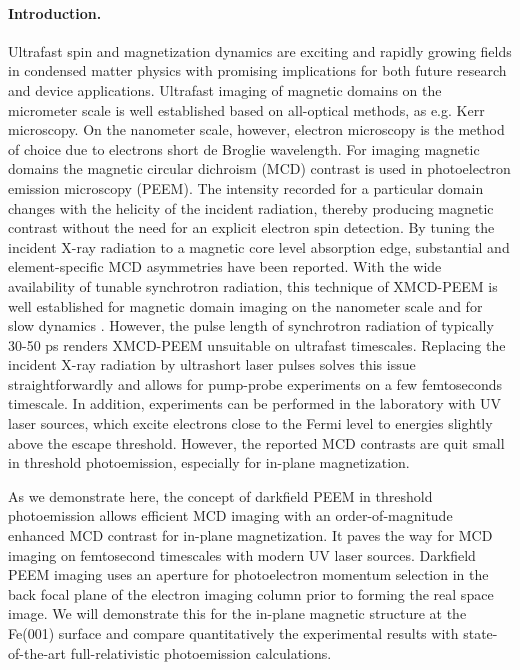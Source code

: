 \documentclass[prl,twocolumn,floatfix]{revtex4-2}
\begin{document}
\paragraph{Introduction.} Ultrafast spin and magnetization dynamics are exciting and rapidly growing fields in condensed matter physics with promising implications for both future research and device applications. Ultrafast imaging of magnetic domains on the micrometer scale is well established based on all-optical methods, as e.g. Kerr microscopy. On the nanometer scale, however, electron microscopy is the method of choice due to electrons short de Broglie wavelength. 
For imaging magnetic domains the magnetic circular dichroism (MCD) contrast is used in photoelectron emission microscopy (PEEM). The intensity recorded for a particular domain changes with the helicity of the incident radiation, thereby producing magnetic contrast without the need for an explicit electron spin detection. By tuning the incident X-ray radiation to a magnetic core level absorption edge, substantial and element-specific MCD asymmetries have been reported. With the wide availability of tunable synchrotron radiation, this technique of XMCD-PEEM is well established for magnetic domain imaging on the nanometer scale and for slow dynamics \cite{kuch15}. However, the pulse length of synchrotron radiation of typically 30-50 ps renders XMCD-PEEM unsuitable on ultrafast timescales. 
Replacing the incident X-ray radiation by ultrashort laser pulses solves this issue straightforwardly and allows for pump-probe experiments on a few femtoseconds timescale. In addition, experiments can be performed in the laboratory with UV laser sources, which excite electrons close to the Fermi level to energies slightly above the escape threshold. However, the reported MCD contrasts are quit small in threshold photoemission, especially for in-plane magnetization. 

As we demonstrate here, the concept of darkfield PEEM in threshold photoemission allows efficient MCD imaging with an order-of-magnitude enhanced MCD contrast for in-plane magnetization. It paves the way for MCD imaging on femtosecond timescales with modern UV laser sources.
Darkfield PEEM imaging uses an aperture for photoelectron momentum selection in the back focal plane of the electron imaging column prior to forming the real space image. We will demonstrate this for the in-plane magnetic structure at the Fe(001) surface and  compare quantitatively the experimental results with state-of-the-art full-relativistic photoemission calculations.
\end{document}
